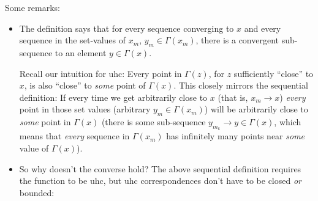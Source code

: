 \documentclass{article}
\begin{document}
Some remarks:
\begin{itemize}[label=$\bullet$]
  \item The definition says that for every sequence converging to $x$ and every sequence in the set-values of $x_m$, $y_m \in \Gamma(x_m)$, there is a convergent sub-sequence to an element $y \in \Gamma(x)$.

    Recall our intuition for uhc: Every point in $\Gamma(z)$, for $z$ sufficiently ``close'' to $x$, is also ``close'' to \textit{some} point of $\Gamma(x)$. This closely mirrors the sequential definition: If every time we get arbitrarily close to $x$ (that is, $x_m \to x$) \textit{every} point in those set values (arbitrary $y_m \in \Gamma(x_m)$) will be arbitrarily close to \textit{some} point in $\Gamma(x)$ (there is some sub-sequence $y_{m_k} \to y \in \Gamma(x)$, which means that \textit{every} sequence in $\Gamma(x_m)$ has infinitely many points near \textit{some} value of $\Gamma(x)$).

  \item So why doesn't the converse hold? The above sequential definition requires the function to be uhc, but uhc correspondences don't have to be closed \textit{or} bounded:
    \begin{figure}[!ht]
      \centering
      \caption{}
      \label{fig:}
    \end{figure}


\end{itemize}
\end{document}
